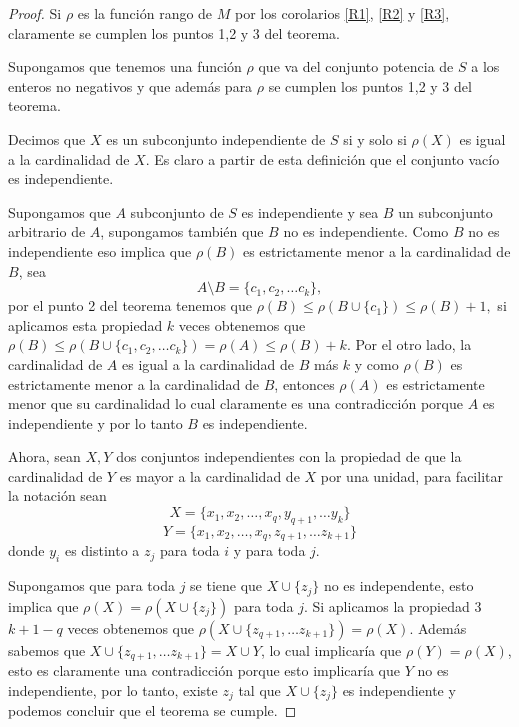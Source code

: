 \begin{proof}
Si $\rho $ es la función rango de $M$ por los corolarios \ref{R1}, \ref{R2} y \ref{R3}, claramente se cumplen los puntos 1,2 y 3 del teorema. 

Supongamos que tenemos una función $\rho$ que va del conjunto potencia de $S$ a los enteros no negativos y que además para $\rho$ se cumplen los puntos 1,2 y 3 del teorema. 

Decimos que $X$ es un subconjunto independiente de $S$ si y solo si $\rho(X)$ es igual a la cardinalidad de $X$. Es claro a partir de esta definición que el conjunto vacío es independiente. 

Supongamos que $A$ subconjunto de $S$ es independiente y sea $B$ un subconjunto arbitrario de $A$, supongamos también que $B$ no es independiente. Como $B$ no es independiente eso implica que $\rho(B)$ es estrictamente menor a la cardinalidad de $B$, sea 
$$A \setminus B = \{ c_1, c_2, \dots c_k\},$$
por el punto 2 del teorema tenemos que $\rho(B) \leq \rho(B \cup \{c_1\}) \leq \rho(B)+1,$ si aplicamos esta propiedad $k$ veces obtenemos que $\rho(B) \leq \rho(B \cup \{ c_1, c_2, \dots c_k\}) = \rho(A) \leq \rho(B)+k.$ Por el otro lado, la cardinalidad de $A$ es igual a la cardinalidad de $B$ más $k$ y como $\rho(B)$ es estrictamente menor a la cardinalidad de $B$, entonces $\rho(A)$ es estrictamente menor que su cardinalidad lo cual claramente es una contradicción porque $A$ es independiente y por lo tanto $B$ es independiente. 

Ahora, sean $X,Y$ dos conjuntos independientes con la propiedad de que la cardinalidad de $Y$ es mayor a la cardinalidad de $X$ por una unidad, para facilitar la notación sean 
$$X = \{ x_1,x_2,\dots, x_q, y_{q+1}, \dots y_k\}$$
$$Y = \{ x_1,x_2,\dots, x_q, z_{q+1}, \dots z_{k+1}\}$$
donde $y_i$ es distinto a $z_j$ para toda $i$ y para toda $j$. 

Supongamos que para toda $j$ se tiene que $X \cup \{z_j\}$ no es independente, esto implica que $\rho(X) =\rho(X \cup \{z_j\})$ para toda $j$. Si aplicamos la propiedad 3 $k+1-q$ veces obtenemos que $\rho(X \cup \{ z_{q+1}, \dots z_{k+1} \} )= \rho(X)$. Además sabemos que $X \cup \{ z_{q+1}, \dots z_{k+1} \}= X \cup Y$, lo cual implicaría que $\rho(Y) = \rho (X)$, esto es claramente una contradicción porque esto implicaría que $Y$ no es independiente, por lo tanto, existe $z_j$ tal que $X \cup \{z_j\}$ es independiente y podemos concluir que el teorema se cumple.
\end{proof}

